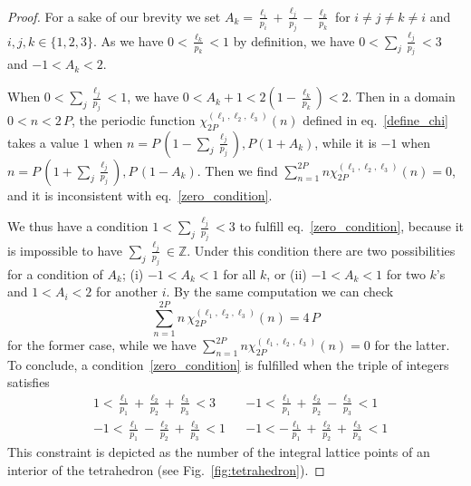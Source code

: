 \documentclass[12pt,reqno]{amsart}
\numberwithin{equation}{section}
\begin{document}
\begin{proof}
  For a sake of our brevity we set
  $A_k=\frac{\ell_i}{p_i}+\frac{\ell_j}{p_j}-\frac{\ell_k}{p_k}$
  for $i\neq j \neq k \neq i$ and $i,j,k\in \{1,2,3\}$.
  As we have $0 < \frac{\ell_k}{p_k}<1$ by
  definition,
  we have
  $0 < \sum_j  \frac{\ell_j}{p_j} < 3$
  and
  $-1 < A_k <2$.

  When $ 0<  \sum_j \frac{\ell_j}{p_j} < 1$,
  we have
  $
  0< A_k  +1 < 2 \left( 1-\frac{\ell_k}{p_k} \right)<2$.
  Then in a domain   $0<n<2 \, P$,
  the periodic function
  $\chi_{2 P}^{(\ell_1,\ell_2,\ell_3)}(n)$
  defined in eq.~\eqref{define_chi}
  takes a value $1$ when
  $n= P \, \left(1-\sum_j \frac{\ell_j}{p_j} \right),
  P (1 + A_k)$,
  while it is
  $-1$
  when
  $n= P \, \left( 1+\sum_j \frac{\ell_j}{p_j} \right),
  P \, \left( 1 - A_k \right)$.
  Then  we find
  $\sum_{n=1}^{2 P} n \chi_{2 P}^{(\ell_1,\ell_2,\ell_3)}(n)=0$,
  and it is inconsistent with eq.~\eqref{zero_condition}.

  We thus have a condition
  $1 < \sum_j  \frac{\ell_j}{p_j} < 3$ to fulfill
  eq.~\eqref{zero_condition},
  because it is impossible to have
  $\sum_j \frac{\ell_j}{p_j} \in \mathbb{Z}$.
  Under  this condition there are two possibilities for a condition of
  $A_k$;
  (i)
  $-1 < A_k <1$ for all $k$,
  or
  (ii)
  $-1 < A_k <1$ for two $k$'s and
  $1<A_i<2$ for another $i$.
  By the same computation we can check
  \begin{equation}
    \label{non_zero_integer}
    \sum_{n=1}^{2 P} n \, \chi_{2 P}^{(\ell_1,\ell_2,\ell_3)}(n)=4 \, P
  \end{equation}
  for the former case, while
  we have
  $\sum_{n=1}^{2 P} n \chi_{2 P}^{(\ell_1,\ell_2,\ell_3)}(n)=0$
  for the latter.
  To conclude,  a condition~\eqref{zero_condition} is fulfilled when
  the triple of integers satisfies
  \begin{equation}
    \label{ell_condition}
    \begin{aligned}
      & 1<\frac{\ell_1}{p_1}+ \frac{\ell_2}{p_2} + \frac{\ell_3}{p_3}<3
      & &
      -1<\frac{\ell_1}{p_1}+ \frac{\ell_2}{p_2} - \frac{\ell_3}{p_3}<1
      \\[2mm]
      &
      -1<\frac{\ell_1}{p_1} - \frac{\ell_2}{p_2} + \frac{\ell_3}{p_3}<1
      & &
      -1<- \frac{\ell_1}{p_1}+ \frac{\ell_2}{p_2} + \frac{\ell_3}{p_3}<1
    \end{aligned}
  \end{equation}
  This constraint is depicted as the number of the integral lattice
  points
  of an interior of the tetrahedron
  (see Fig.~\ref{fig:tetrahedron}).



\end{proof}
\end{document}
